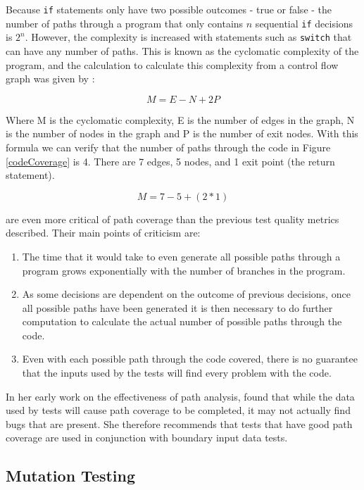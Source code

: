 Because \verb+if+ statements only have two possible outcomes - true or false - the number of paths through a program that only contains $n$ sequential \verb+if+ decisions is $2^n$. However, the complexity is increased with statements such as \verb+switch+ that can have any number of paths. This is known as the cyclomatic complexity of the program, and the calculation to calculate this complexity from a control flow graph was given by \citet{1702388}:

\begin{equation}
M = E - N + 2P
\end{equation}

Where M is the cyclomatic complexity, E is the number of edges in the graph, N is the number of nodes in the graph and P is the number of exit nodes. With this formula we can verify that the number of paths through the code in Figure \ref{codeCoverage} is 4. There are 7 edges, 5 nodes, and 1 exit point (the return statement).

\begin{equation}
M = 7 - 5 + (2*1)
\end{equation}

\citet{Myers:2004:AST:983238} are even more critical of path coverage than the previous test quality metrics described. Their main points of criticism are:

\begin{enumerate}
\item The time that it would take to even generate all possible paths through a program grows exponentially with the number of branches in the program.
\item As some decisions are dependent on the outcome of previous decisions, once all possible paths have been generated it is then necessary to do further computation to calculate the actual number of possible paths through the code.
\item Even with each possible path through the code covered, there is no guarantee that the inputs used by the tests will find every problem with the code.
\end{enumerate}

In her early work on the effectiveness of path analysis, \citet{1658851} found that while the data used by tests will cause path coverage to be completed, it may not actually find bugs that are present. She therefore recommends that tests that have good path coverage are used in conjunction with boundary input data tests.

\subsection{Mutation Testing}

